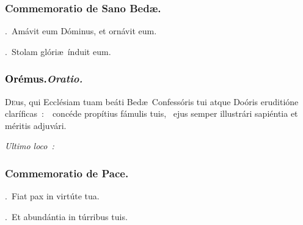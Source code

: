 \documentclass[12pt]{article} %
\newenvironment{rubric}{\vspace{2 mm}\color{benred8} \itshape \leftskip 0in \setlength{\parindent}{0.25in}}{\vspace{2 mm}}
\newenvironment{response}{\leftskip 0in \setlength{\parindent}{0in}}{\vspace{2 mm}}
\let\oldgresixstar\gresixstar
\renewcommand{\gresixstar}{\textcolor{benred8}{\oldgresixstar}}
\let\oldgredagger\gredagger
\renewcommand{\gredagger}{\textcolor{benred8}{\oldgredagger}}
\let\oldVbar\Vbar
\renewcommand{\Vbar}{\textcolor{benred8}{\oldVbar .}}
\let\oldRbar\Rbar
\renewcommand{\Rbar}{\textcolor{benred8}{\oldRbar .}}
\def\capitulumSpace{\hspace{20 mm}}
\begin{document}
\subsubsection*{Commemoratio de Sano Bed\ae .}

\gresetfirstlineaboveinitial{\small \textsc{ \textbf{\textcolor{benred8}{IV}}}}{\small \textsc{ \textbf{\textcolor{benred8}{IV}}}}


\begin{response}
\Vbar\ Am\'{a}vit eum D\'{o}minus, et orn\'{a}vit eum.

\Rbar\ Stolam gl\'{o}ri\ae\ \'{i}nduit eum.

\end{response}

\subsubsection*{\textcolor{black}{Or\'{e}mus.}\capitulumSpace \emph{Oratio.}}

\begin{response}\lettrine{D}{e}us, qui Eccl\'{e}siam tuam be\'{a}ti Bed\ae\ Confess\'{o}ris tui atque Do\'{o}ris eruditi\'{o}ne clar\'{i}ficas~:~\gredagger\ conc\'{e}de prop\'{i}tius f\'{a}mulis tuis, \gresixstar\ ejus semper illustr\'{a}ri sapi\'{e}ntia et m\'{e}ritis adjuv\'{a}ri.

\end{response}

\begin{rubric}
Ultimo loco~:

\end{rubric}



\subsubsection*{Commemoratio de Pace.}


\gresetfirstlineaboveinitial{\small \textsc{ \textbf{\textcolor{benred8}{II}}}}{\small \textsc{ \textbf{\textcolor{benred8}{II}}}}

\begin{response}
\Vbar\ Fiat pax in virt\'{u}te tua.

\Rbar\ Et abund\'{a}ntia in t\'{u}rribus tuis.

\end{response}
\end{document}
